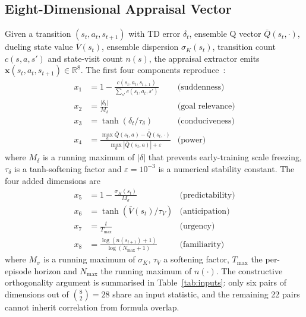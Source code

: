 \documentclass[conference]{IEEEtran}
\begin{document}
\subsection{Eight-Dimensional Appraisal Vector}
\label{sec:appraisal}
Given a transition $(s_{t}, a_{t}, s_{t+1})$ with TD error $\delta_{t}$,
ensemble Q vector $\bar Q(s_{t}, \cdot)$, dueling state value $\bar V(s_{t})$,
ensemble dispersion $\sigma_{K}(s_{t})$, transition count
$c(s, a, s')$ and state-visit count $n(s)$, the appraisal extractor emits
$\mathbf{x}(s_{t}, a_{t}, s_{t+1}) \in \mathbb{R}^{8}$. The first four
components reproduce~\cite{zhang2023modeling}:
\begin{align}
x_{1} &= 1 - \frac{c(s_{t}, a_{t}, s_{t+1})}{\sum_{s'} c(s_{t}, a_{t}, s')}
   & \text{(suddenness)} \label{eq:sud}\\
x_{2} &= \frac{|\delta_{t}|}{M_{\delta}}
   & \text{(goal relevance)} \label{eq:gr}\\
x_{3} &= \tanh(\delta_{t}/\tau_{\delta})
   & \text{(conduciveness)} \label{eq:cond}\\
x_{4} &= \frac{\max_{a} \bar Q(s_{t},a) - \overline{\bar Q}(s_{t},\cdot)}{\max_{a}|\bar Q(s_{t},a)| + \varepsilon}
   & \text{(power)} \label{eq:pow}
\end{align}
where $M_{\delta}$ is a running maximum of $|\delta|$ that prevents
early-training scale freezing, $\tau_{\delta}$ is a tanh-softening factor and
$\varepsilon = 10^{-3}$ is a numerical stability constant. The four added
dimensions are
\begin{align}
x_{5} &= 1 - \frac{\sigma_{K}(s_{t})}{M_{\sigma}}
   & \text{(predictability)} \label{eq:pred}\\
x_{6} &= \tanh(\bar V(s_{t})/\tau_{V})
   & \text{(anticipation)} \label{eq:antic}\\
x_{7} &= \frac{t}{T_{\max}}
   & \text{(urgency)} \label{eq:urg}\\
x_{8} &= \frac{\log(n(s_{t+1})+1)}{\log(N_{\max}+1)}
   & \text{(familiarity)} \label{eq:fam}
\end{align}
where $M_{\sigma}$ is a running maximum of $\sigma_{K}$, $\tau_{V}$ a
softening factor, $T_{\max}$ the per-episode horizon and $N_{\max}$ the
running maximum of $n(\cdot)$. The constructive orthogonality argument is
summarised in Table~\ref{tab:inputs}: only six pairs of dimensions out of
$\binom{8}{2}=28$ share an input statistic, and the remaining 22 pairs cannot
inherit correlation from formula overlap.
\end{document}
